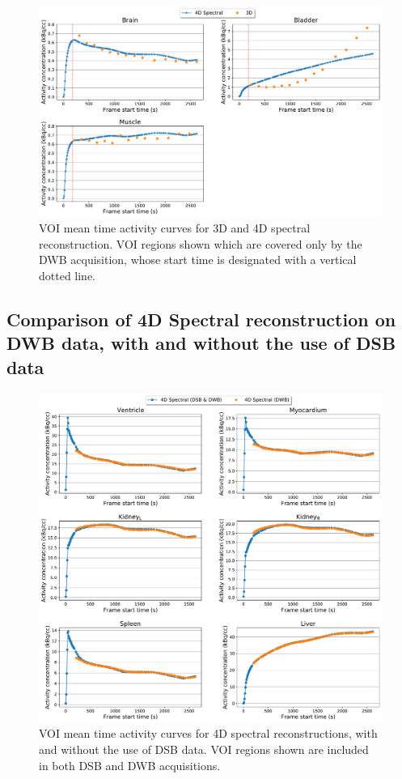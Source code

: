 \begin{figure} [h!]
\centering
\includegraphics[scale=0.5,angle=0]{3_Results/3_3_DWB_Reconstruction/figures/3_3_IsotoPK_CTRL_DWB_3D_vs_4D_peripheral.pdf}
\caption{VOI mean time activity curves for 3D and 4D spectral reconstruction. VOI regions shown which are covered only by the DWB acquisition, whose start time is designated with a vertical dotted line.}
\label{fig_3_3:IsotoPK_CTRL_DWB_4D_vs_3D_Peripheral}
\end{figure} 


\subsection{Comparison of 4D Spectral reconstruction on DWB data, with and without the use of DSB data}

\begin{figure} [h!]
\centering
\includegraphics[scale=0.5,angle=0]{3_Results/3_3_DWB_Reconstruction/figures/3_3_IsotoPK_CTRL_DWB_4D_vs_4D_central.pdf}
\caption{VOI mean time activity curves for 4D spectral reconstructions, with and without the use of DSB data. VOI regions shown are included in both DSB and DWB acquisitions.}
\label{fig_3_3:IsotoPK_CTRL_DWB_4D_vs_3D_Peripheral}
\end{figure} 

